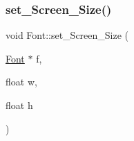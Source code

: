 \mbox{\label{namespace_font_a1045d7bc4b1e4678b8277dad135af8ff}} 
\subsubsection{\texorpdfstring{set\+\_\+\+Screen\+\_\+\+Size()}{set\_Screen\_Size()}}
{\footnotesize\ttfamily void Font\+::set\+\_\+\+Screen\+\_\+\+Size (\begin{DoxyParamCaption}\item[{\mbox{\hyperlink{struct_font_1_1_font}{Font}} $\ast$}]{f,  }\item[{float}]{w,  }\item[{float}]{h }\end{DoxyParamCaption})}

